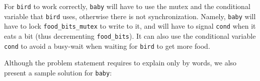 \documentclass{sope}
\begin{document}





For \texttt{bird} to work correctly, \texttt{baby} will have to use the mutex and the conditional variable that \texttt{bird} uses, otherwise there is not synchronization. Namely, \texttt{baby} will have to lock \texttt{food\_bits\_mutex} to write to it, and will have to signal \texttt{cond} when it eats a bit (thus decrementing \texttt{food\_bits}). It can also use the conditional variable \texttt{cond} to avoid a busy-wait when waiting for \texttt{bird} to get more food.

\newpage
Although the problem statement requires to explain only by words, we also present a sample solution for \texttt{baby}:




\end{document}
